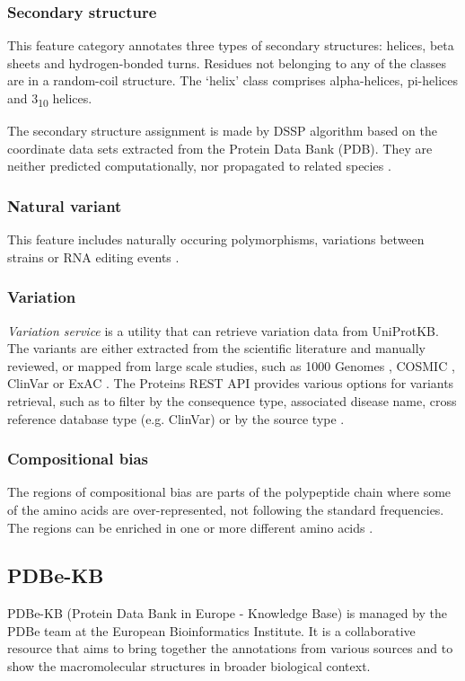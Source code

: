 \subsubsection{Secondary structure}
This feature category annotates three types of secondary structures: helices, beta sheets and hydrogen-bonded turns. Residues not belonging to any of the classes are in a random-coil structure. The `helix' class comprises alpha-helices, pi-helices and 3\textsubscript{10} helices.

The secondary structure assignment is made by DSSP algorithm \cite{dssp} based on the coordinate data sets extracted from the Protein Data Bank (PDB). They are neither predicted computationally, nor propagated to related species \cite{sec_str}.

\subsubsection{Natural variant}
This feature includes naturally occuring polymorphisms, variations between strains or RNA editing events \cite{natural_variant}.

\subsubsection{Variation}
\textit{Variation service} is a utility that can retrieve variation data from UniProtKB. The variants are either extracted from the scientific literature and manually reviewed, or mapped from large scale studies, such as 1000 Genomes \cite{1000genomes}, COSMIC \cite{cosmic}, ClinVar \cite{clinvar} or ExAC \cite{exac}. The Proteins REST API provides various options for variants retrieval, such as to filter by the consequence type, associated disease name, cross reference database type (e.g. ClinVar) or by the source type \cite{proteins_api}.


\subsubsection{Compositional bias}
The regions of compositional bias are parts of the polypeptide chain where some of the amino acids are over-represented, not following the standard frequencies. The regions can be enriched in one or more different amino acids \cite{compbias}.



\subsection{PDBe-KB}
PDBe-KB (Protein Data Bank in Europe - Knowledge Base) \cite{pdbekb} is managed by the PDBe team at the European Bioinformatics Institute. It is a collaborative resource that aims to bring together the annotations from various sources and to show the macromolecular structures in broader biological context. 

